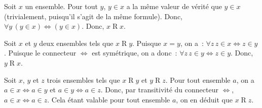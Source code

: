 \blank[medium]

\noindent{}
\blank[samepage]
\startitemize[nowhite]
  \item Soit $x$ un ensemble. Pour tout $y$, $y \in x$ a la même valeur de vérité que $y \in x$ (trivialement, puisqu'il s'agit de la même formule).
      Donc, $\forall y \, (y \in x) \Leftrightarrow (y \in x)$. 
      Donc, $x \mathrel{R} x$.
  \item Soit $x$ et $y$ deux ensembles tels que $x \mathrel{R} y$. 
      Puisque $x = y$, on a : $\forall z \, z \in x \Leftrightarrow z \in y$. 
      Puisque le connecteur $\Leftrightarrow$ est symétrique, on a donc : $\forall z \, z \in y \Leftrightarrow z \in y$.
      Donc, $y \mathrel{R} x$.
  \item Soit $x$, $y$ et $z$ trois ensembles tels que $x \mathrel{R} y$ et $y \mathrel{R} z$. 
      Pour tout ensemble $a$, on a $a \in x \Leftrightarrow a \in y$ et $a \in y \Leftrightarrow a \in z$. 
      Donc, par transitivité du connecteur $\Leftrightarrow$, $a \in x \Leftrightarrow a \in z$. 
      Cela étant valable pour tout ensemble $a$, on en déduit que $x \mathrel{R} z$.
\stopitemize
\done

\blank[medium]

